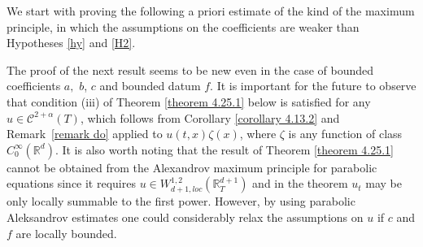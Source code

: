 \documentclass[reqno,12pt]{amsart}
\theoremstyle{definition}
\theoremstyle{remark}
\begin{document}
                                           \label{section 4.16.3}

   We start with proving the following a priori estimate
   of the kind of the maximum principle, in which the assumptions
on the coefficients are      weaker than Hypotheses \ref{hy} and
\ref{H2}.

   The proof of the next result seems to be new even in the case
of bounded coefficients $a,$ $b$, $c$ and bounded datum $f$.  It
is important for the future to observe that condition (iii) of
Theorem \ref{theorem 4.25.1} below is satisfied for any
   $u\in{\mathcal{C}}^{2+\alpha}(T)$,
    which follows from  Corollary \ref{corollary 4.13.2}
and Remark~\ref{remark do} applied to $u(t,x)\zeta(x)$, where
$\zeta$ is any function of class $C^{\infty}_{0} ({\mathbb{R}}^{d})$. It is
also worth noting that the result of Theorem \ref{theorem 4.25.1}
cannot be obtained from the Alexandrov maximum principle for
parabolic equations since it requires $u\in
W^{1,2}_{d+1,loc}({\mathbb{R}}^{d+1}_{T})$ and in the theorem $u_{t}$ may
be only locally summable to the first power. However, by using
parabolic Aleksandrov estimates one could considerably relax the
assumptions on $u$ if $c$ and $f$ are locally bounded.
\end{document}
